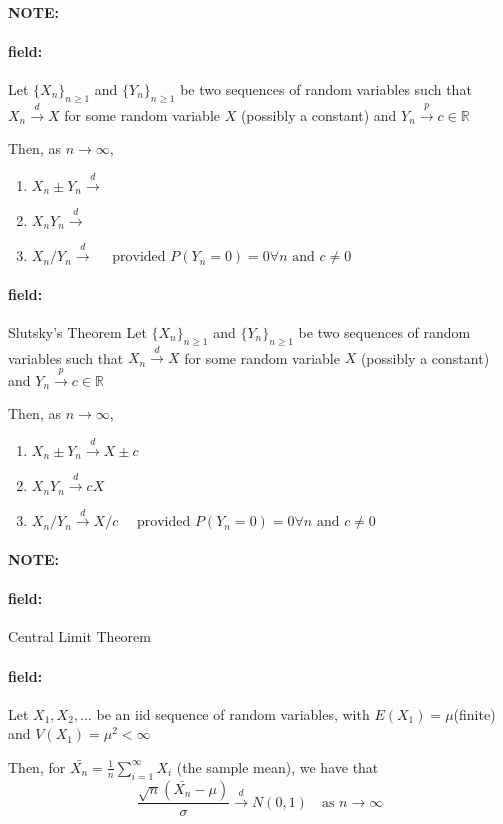 \documentclass[12pt]{article}
\newenvironment{note}{\paragraph{NOTE:}}{}
\newenvironment{field}{\paragraph{field:}}{}
\begin{document}
\begin{note}
  \begin{field}
    Let $\{X_n\}_{n \geq 1}$ and $\{Y_n\}_{n \geq 1}$ be two sequences of random variables such that $X_n \overset{d}{\to}X$ for some random variable $X$ (possibly a constant) and $Y_n \overset{p}{\to} c \in \mathbb{R}$

    Then, as $n \to \infty$,

    \begin{enumerate}
      \item $X_n \pm Y_n \overset{d}{\to} $
      \item $X_nY_n \overset{d}{\to} $
      \item $X_n/Y_n \overset{d}{\to} \quad \text{ provided } P(Y_n = 0) = 0 \forall n \text{ and } c \neq 0$
    \end{enumerate}
  \end{field}
  \begin{field}
    Slutsky's Theorem
    Let $\{X_n\}_{n \geq 1}$ and $\{Y_n\}_{n \geq 1}$ be two sequences of random variables such that $X_n \overset{d}{\to}X$ for some random variable $X$ (possibly a constant) and $Y_n \overset{p}{\to} c \in \mathbb{R}$

    Then, as $n \to \infty$,

    \begin{enumerate}
      \item $X_n \pm Y_n \overset{d}{\to} X \pm c$
      \item $X_nY_n \overset{d}{\to} cX$
      \item $X_n/Y_n \overset{d}{\to} X/c \quad \text{ provided } P(Y_n = 0) = 0 \forall n \text{ and } c \neq 0$
    \end{enumerate}
  \end{field}
\end{note}

\begin{note}
  \begin{field}
    Central Limit Theorem
  \end{field}
  \begin{field}
    Let $X_1, X_2, \ldots$ be an iid sequence of random variables, with $E(X_1) = \mu$(finite) and $V(X_1) = \mu^2 < \infty$

    Then, for $\bar{X_n} = \frac{1}{n }\sum_{i = 1}^\infty X_i$ (the sample mean), we have that
    $$ \frac{\sqrt{n}(\bar{X_n} - \mu)}{\sigma} \overset{d}{\to} N(0,1) \quad \text{as } n \to
    \infty$$
  \end{field}
\end{note}
\end{document}
